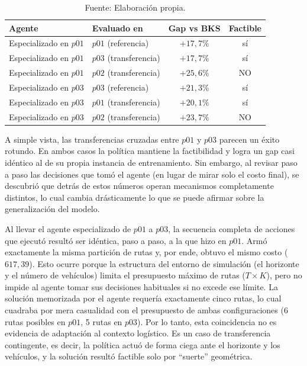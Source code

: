 \begin{table}[H]
    \centering
    \caption{\label{tab:cero-shot} Transferencia cero-shot entre $p01$, $p02$ y $p03$. El agente evaluado sobre su propia instancia de entrenamiento se marca como referencia.}
    \caption*{Fuente: Elaboración propia.}
    \small
    \renewcommand{\arraystretch}{1.15}
    \setlength{\tabcolsep}{10pt}
    \begin{tabular}{@{}llcc@{}}
        \toprule
        \textbf{Agente} & \textbf{Evaluado en} & \textbf{Gap vs BKS} & \textbf{Factible} \\
        \midrule
        Especializado en $p01$ & $p01$ (referencia)     & $+17{,}7\%$ & sí \\
        Especializado en $p01$ & $p03$ (transferencia)  & $+17{,}7\%$ & sí \\
        Especializado en $p01$ & $p02$ (transferencia)  & $+25{,}6\%$ & NO \\
        \midrule
        Especializado en $p03$ & $p03$ (referencia)     & $+21{,}3\%$ & sí \\
        Especializado en $p03$ & $p01$ (transferencia)  & $+20{,}1\%$ & sí \\
        Especializado en $p03$ & $p02$ (transferencia)  & $+23{,}7\%$ & NO \\
        \bottomrule
    \end{tabular}
\end{table}

A simple vista, las transferencias cruzadas entre $p01$ y $p03$ parecen un éxito rotundo. En ambos casos la política mantiene la factibilidad y logra un gap casi idéntico al de su propia instancia de entrenamiento. Sin embargo, al revisar paso a paso las decisiones que tomó el agente (en lugar de mirar solo el costo final), se descubrió que detrás de estos números operan mecanismos completamente distintos, lo cual cambia drásticamente lo que se puede afirmar sobre la generalización del modelo.

Al llevar el agente especializado de $p01$ a $p03$, la secuencia completa de acciones que ejecutó resultó ser idéntica, paso a paso, a la que hizo en $p01$. Armó exactamente la misma partición de rutas y, por ende, obtuvo el mismo costo ($617{,}39$). Esto ocurre porque la estructura del entorno de simulación (el horizonte y el número de vehículos) limita el presupuesto máximo de rutas ($T \times K$), pero no impide al agente tomar sus decisiones habituales si no excede ese límite. La solución memorizada por el agente requería exactamente cinco rutas, lo cual cuadraba por mera casualidad con el presupuesto de ambas configuraciones (6 rutas posibles en $p01$, 5 rutas en $p03$). Por lo tanto, esta coincidencia no es evidencia de adaptación al contexto logístico. Es un caso de transferencia contingente, es decir, la política actuó de forma ciega ante el horizonte y los vehículos, y la solución resultó factible solo por \enquote{suerte} geométrica.

